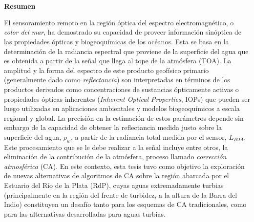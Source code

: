 \chapter*{\runtitulo}

\noindent
\textbf{Resumen}

El sensoramiento remoto en la región óptica del espectro electromagnético, o \textit{color del mar}, ha demostrado su capacidad de proveer información sinóptica de las propiedades ópticas y biogeoquímicas de los océanos. Esta se basa en la determinación de la radiancia espectral que proviene de la superficie del agua que es obtenida a partir de la señal que llega al tope de la atmósfera (TOA). La amplitud y la forma del espectro de este producto geofísico primario (generalmente dado como \textit{reflectancia}) son interpretadas en términos de los productos derivados como concentraciones de sustancias ópticamente activas o propiedades ópticas inherentes (\textit{Inherent Optical Properties}, IOPs) que pueden ser luego utilizadas en aplicaciones ambientales y modelos biogeoquímicos a escala regional y global. La precisión en la estimación de estos parámetros depende sin embargo de la capacidad de obtener la reflectancia medida justo sobre la superficie del agua, $\rho_{w}$, a partir de la radiancia total medida por el sensor, $L_{TOA}$. Este procesamiento que se le debe realizar a la señal incluye entre otros, la eliminación de la contribución de la atmósfera, proceso llamado \textit{corrección atmosférica} (CA). En este contexto, esta tesis tuvo como objetivo la exploración de nuevas alternativas de algoritmos de CA sobre la región abarcada por el Estuario del Río de la Plata (RdP), cuyas aguas extremadamente turbias (principalmente en la región del frente de turbidez, a la altura de la Barra del Indio) constituyen un desafío tanto para los esquemas de CA tradicionales, como para las alternativas desarrolladas para aguas turbias.



